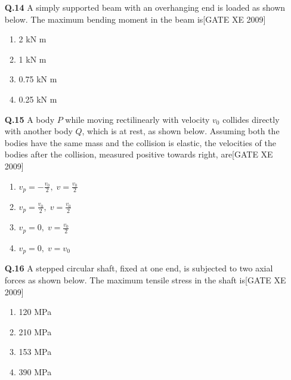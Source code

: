 \documentclass[journal,12pt,onecolumn]{IEEEtran}
\theoremstyle{remark}
\begin{document}
\begin{enumerate}
\begin{enumerate}
\setcounter{enumi}{13} 

\item[\textbf{Q.14}] A simply supported beam with an overhanging end is loaded as shown below. The maximum bending moment in the beam is\hfill[GATE XE 2009]

\begin{multicols}{2}
\begin{enumerate}
    \item 2 kN m
    \item 1 kN m
    \item 0.75 kN m
    \item 0.25 kN m
\end{enumerate}
\end{multicols}

\vspace{0.3cm}

\item[\textbf{Q.15}] A body $ P $ while moving rectilinearly with velocity $ v_0 $ collides directly with another body $ Q $, which is at rest, as shown below. Assuming both the bodies have the same mass and the collision is elastic, the velocities of the bodies after the collision, measured positive towards right, are\hfill[GATE XE 2009]

\begin{multicols}{2}
\begin{enumerate}
    \item $v_p = -\frac{v_0}{2},\; v = \frac{v_0}{2}$
    \item $v_p = \frac{v_0}{2},\; v = \frac{v_0}{2}$
    \item $v_p = 0,\; v = \frac{v_0}{2}$
    \item $v_p = 0,\; v = v_0$
\end{enumerate}
\end{multicols}

\vspace{0.3cm}

\item[\textbf{Q.16}] A stepped circular shaft, fixed at one end, is subjected to two axial forces as shown below. The maximum tensile stress in the shaft is\hfill[GATE XE 2009]

\begin{multicols}{2}
\begin{enumerate}
    \item 120 MPa
    \item 210 MPa
    \item 153 MPa
    \item 390 MPa
\end{enumerate}
\end{multicols}


\end{enumerate}
\end{enumerate}
\end{document}
